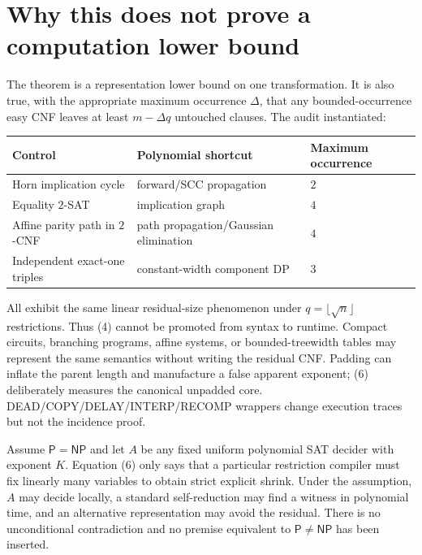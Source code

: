 \documentclass[11pt]{article}
\newcommand{\Pclass}{\mathsf P}
\newcommand{\NPclass}{\mathsf{NP}}
\begin{document}
\section{Why this does not prove a computation lower bound}
The theorem is a representation lower bound on one transformation.  It is
also true, with the appropriate maximum occurrence $\Delta$, that any
bounded-occurrence easy CNF leaves at least $m-\Delta q$ untouched clauses.
The audit instantiated:
\begin{center}
\begin{tabular}{lll}
\toprule
Control & Polynomial shortcut & Maximum occurrence\\
\midrule
Horn implication cycle & forward/SCC propagation & $2$\\
Equality $2$-SAT & implication graph & $4$\\
Affine parity path in $2$-CNF & path propagation/Gaussian elimination & $4$\\
Independent exact-one triples & constant-width component DP & $3$\\
\bottomrule
\end{tabular}
\end{center}
All exhibit the same linear residual-size phenomenon under
$q=\lfloor\sqrt n\rfloor$ restrictions.  Thus (4) cannot be promoted from
syntax to runtime.  Compact circuits, branching programs, affine systems,
or bounded-treewidth tables may represent the same semantics without
writing the residual CNF.  Padding can inflate the parent length and
manufacture a false apparent exponent; (6) deliberately measures the
canonical unpadded core.  DEAD/COPY/DELAY/INTERP/RECOMP wrappers change
execution traces but not the incidence proof.

Assume $\Pclass=\NPclass$ and let $A$ be any fixed uniform polynomial SAT
decider with exponent $K$.  Equation (6) only says that a particular
restriction compiler must fix linearly many variables to obtain strict
explicit shrink.  Under the assumption, $A$ may decide locally, a standard
self-reduction may find a witness in polynomial time, and an alternative
representation may avoid the residual.  There is no unconditional
contradiction and no premise equivalent to $\Pclass\ne\NPclass$ has been
inserted.
\end{document}
